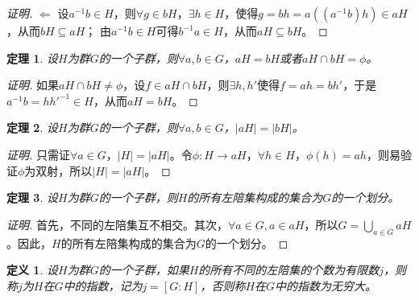\documentclass{article}
\newtheorem{Def}{定义}
\newtheorem{Thm}{定理}
\begin{document}
\begin{CJK*}{UTF8}{gbsn}
\begin{proof}[证明]
  $\Leftarrow$
  设$a^{-1}b\in H$，则$\forall g\in bH$，$\exists h\in H$，使得$g=bh=a((a^{-1}b)h)\in aH$，从而$bH\subseteq aH$；
  由$a^{-1}b\in H$可得$b^{-1}a\in H$，从而$aH\subseteq bH$。
\end{proof}
\begin{Thm}
  设$H$为群$G$的一个子群，则$\forall a,b\in G$，$aH=bH$或者$aH\cap bH=\phi$。
\end{Thm}
\begin{proof}[证明]
  如果$aH\cap bH\neq \phi$，设$f\in aH\cap bH$，则$\exists h,h'$使得$f=ah=bh'$，于是$a^{-1}b=hh'^{-1}\in H$，从而$aH=bH$。
\end{proof}
\begin{Thm}
  设$H$为群$G$的一个子群，则$\forall a,b\in G$，$|aH|=|bH|$。
\end{Thm}
\begin{proof}[证明]
  只需证$\forall a\in G$，$|H|=|aH|$。令$\phi:H\to aH$，$\forall h\in H$，$\phi(h)=ah$，则易验证$\phi$为双射，所以$|H|=|aH|$。
\end{proof}
\begin{Thm}
  设$H$为群$G$的一个子群，则$H$的所有左陪集构成的集合为$G$的一个划分。
\end{Thm}
\begin{proof}[证明]
  首先，不同的左陪集互不相交。其次，$\forall a\in G,a\in aH$，所以$G=\bigcup_{a\in G}aH$。因此，$H$的所有左陪集构成的集合为$G$的一个划分。
\end{proof}
\begin{Def}
  设$H$为群$G$的一个子群，如果$H$的所有不同的左陪集的个数为有限数$j$，则称$j$为$H$在$G$中的指数，记为$j=[G:H]$，否则称$H$在$G$中的指数为无穷大。
\end{Def}


\end{CJK*}
\end{document}
